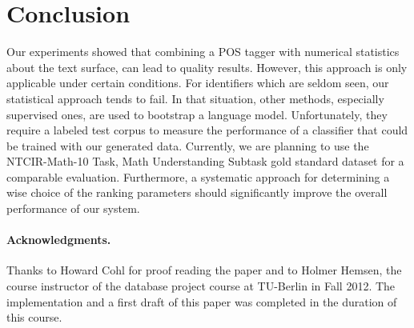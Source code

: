 \documentclass[runningheads]{llncs}
\begin{document}
\section{Conclusion}
Our experiments showed that combining a POS tagger with numerical statistics
about the text surface, can lead to quality results.
However, this approach is
only applicable under certain conditions. 
For identifiers which
are seldom seen, our statistical approach tends to fail.
In that situation, other methods, especially supervised ones, are used to
bootstrap a language model.
Unfortunately, they require a labeled test
corpus to measure the performance of a classifier that could be trained with our generated data.
Currently, we are planning to use the
NTCIR-Math-10 Task, Math Understanding Subtask gold standard dataset \cite{overview}
for a comparable evaluation.
Furthermore, a systematic approach for determining a wise choice of the ranking parameters should significantly improve the overall performance of our system.
\paragraph*{Acknowledgments.}
Thanks to Howard Cohl for proof reading the paper and to Holmer Hemsen, the course instructor of the database project course at TU-Berlin in Fall 2012. The implementation and a first draft of this paper was completed in the duration of this course.


\begingroup
\let\clearpage\relax

\endgroup
\end{document}

